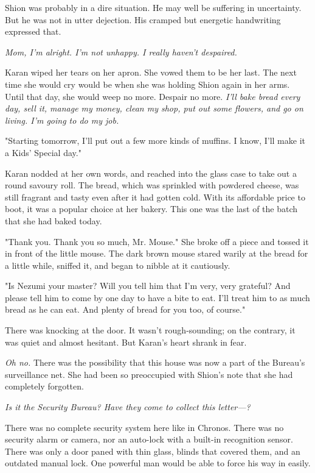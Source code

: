 Shion was probably in a dire situation. He may well be suffering in
uncertainty. But he was not in utter dejection. His cramped but
energetic handwriting expressed that.

\emph{Mom, I'm alright. I'm not unhappy. I really haven't despaired.}

Karan wiped her tears on her apron. She vowed them to be her last. The
next time she would cry would be when she was holding Shion again in her
arms. Until that day, she would weep no more. Despair no more. \emph{I'll bake
bread every day, sell it, manage my money, clean my shop, put out some
flowers, and go on living. I'm going to do my job.}

"Starting tomorrow, I'll put out a few more kinds of muffins. I know,
I'll make it a Kids' Special day."

Karan nodded at her own words, and reached into the glass case to take
out a round savoury roll. The bread, which was sprinkled with powdered
cheese, was still fragrant and tasty even after it had gotten cold. With
its affordable price to boot, it was a popular choice at her bakery.
This one was the last of the batch that she had baked today.

"Thank you. Thank you so much, Mr. Mouse." She broke off a piece and
tossed it in front of the little mouse. The dark brown mouse stared
warily at the bread for a little while, sniffed it, and began to nibble
at it cautiously.

"Is Nezumi your master? Will you tell him that I'm very, very grateful?
And please tell him to come by one day to have a bite to eat. I'll treat
him to as much bread as he can eat. And plenty of bread for you too, of
course."

There was knocking at the door. It wasn't rough-sounding; on the
contrary, it was quiet and almost hesitant. But Karan's heart shrank in
fear.

\emph{Oh no.} There was the possibility that this house was now a part of the
Bureau's surveillance net. She had been so preoccupied with Shion's note
that she had completely forgotten.

\emph{Is it the Security Bureau? Have they come to collect this letter---?}

There was no complete security system here like in Chronos. There was no
security alarm or camera, nor an auto-lock with a built-in recognition
sensor. There was only a door paned with thin glass, blinds that covered
them, and an outdated manual lock. One powerful man would be able to
force his way in easily.

